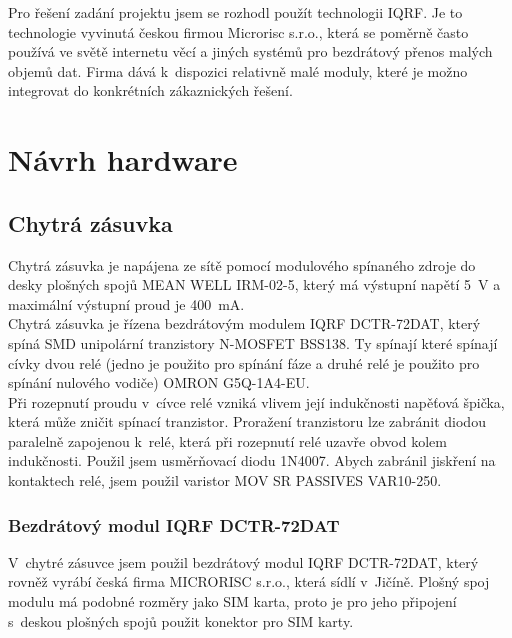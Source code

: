 \documentclass[12pt,a4paper,oneside]{article}
\begin{document}
Pro řešení zadání projektu jsem se rozhodl použít technologii IQRF. Je to technologie vyvinutá českou firmou Microrisc s.r.o., která se poměrně často používá ve světě internetu věcí a jiných systémů pro bezdrátový přenos malých objemů dat. Firma dává k~dispozici relativně malé moduly, které je možno integrovat do konkrétních zákaznických řešení.

\newpage

\section{Návrh hardware}

\subsection{Chytrá zásuvka}

Chytrá zásuvka je napájena ze sítě pomocí modulového spínaného zdroje do desky plošných spojů MEAN WELL IRM-02-5, který má výstupní napětí 5~V a maximální výstupní proud je 400~mA. \\

Chytrá zásuvka je řízena bezdrátovým modulem IQRF DCTR-72DAT, který spíná SMD unipolární tranzistory N-MOSFET BSS138. Ty spínají které spínají cívky dvou relé (jedno je použito pro spínání fáze a druhé relé je použito pro spínání nulového vodiče) OMRON G5Q-1A4-EU. \\

Při rozepnutí proudu v~cívce relé vzniká vlivem její indukčnosti napěťová špička, která může zničit spínací tranzistor. Proražení tranzistoru lze zabránit diodou paralelně zapojenou k~relé, která při rozepnutí relé uzavře obvod kolem indukčnosti. Použil jsem usměrňovací diodu 1N4007. Abych zabránil jiskření na kontaktech relé, jsem použil varistor MOV SR PASSIVES VAR10-250.

\newpage

\subsubsection{Bezdrátový modul IQRF DCTR-72DAT}

V~chytré zásuvce jsem použil bezdrátový modul IQRF DCTR-72DAT, který rovněž vyrábí česká firma MICRORISC s.r.o., která sídlí v~Jičíně. Plošný spoj modulu má podobné rozměry jako SIM karta, proto je pro jeho připojení s~deskou plošných spojů použit konektor pro SIM karty. \\
\end{document}
